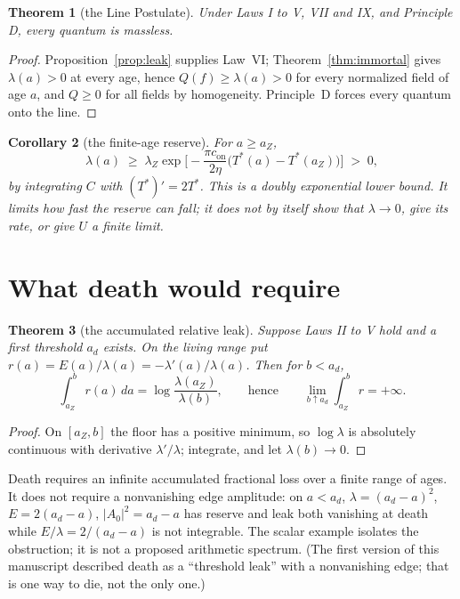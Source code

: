 \documentclass[11pt]{article}
\newtheorem{theorem}{Theorem}[section]
\newtheorem{corollary}[theorem]{Corollary}
\theoremstyle{definition}
\theoremstyle{remark}
\newcommand{\Tst}{T^{*}}
\newcommand{\lamZ}{\lambda_{Z}}
\newcommand{\con}{c_{\mathrm{on}}}
\begin{document}
\begin{theorem}[the Line Postulate]\label{thm:line}
Under Laws I to V, VII and IX, and Principle D, every quantum is massless.
\end{theorem}

\begin{proof}
Proposition~\ref{prop:leak} supplies Law~VI; Theorem~\ref{thm:immortal} gives $\lambda(a)>0$ at every age, hence $Q(f)\ge\lambda(a)>0$ for every normalized field of age $a$, and $Q\ge0$ for all fields by homogeneity. Principle~D forces every quantum onto the line.
\end{proof}

\begin{corollary}[the finite-age reserve]\label{cor:cooling}
For $a\ge a_Z$,
\[
\lambda(a)\;\ge\;\lamZ\exp\Big[-\frac{\pi\con}{2\eta}\big(\Tst(a)-\Tst(a_Z)\big)\Big]\;>\;0 ,
\]
by integrating $C$ with $(\Tst)'=2\Tst$. This is a doubly exponential lower bound. It limits how fast the reserve can fall; it does not by itself show that $\lambda\to0$, give its rate, or give $U$ a finite limit.
\end{corollary}

\section{What death would require}

\begin{theorem}[the accumulated relative leak]\label{thm:accum}
Suppose Laws II to V hold and a first threshold $a_d$ exists. On the living range put $r(a)=E(a)/\lambda(a)=-\lambda'(a)/\lambda(a)$. Then for $b<a_d$,
\[
\int_{a_Z}^{b}r(a)\,da=\log\frac{\lambda(a_Z)}{\lambda(b)},\qquad\text{hence}\qquad \lim_{b\uparrow a_d}\int_{a_Z}^{b}r=+\infty .
\]
\end{theorem}

\begin{proof}
On $[a_Z,b]$ the floor has a positive minimum, so $\log\lambda$ is absolutely continuous with derivative $\lambda'/\lambda$; integrate, and let $\lambda(b)\to0$.
\end{proof}

Death requires an infinite accumulated fractional loss over a finite range of ages. It does not require a nonvanishing edge amplitude: on $a<a_d$, $\lambda=(a_d-a)^2$, $E=2(a_d-a)$, $|A_0|^2=a_d-a$ has reserve and leak both vanishing at death while $E/\lambda=2/(a_d-a)$ is not integrable. The scalar example isolates the obstruction; it is not a proposed arithmetic spectrum. (The first version of this manuscript described death as a ``threshold leak'' with a nonvanishing edge; that is one way to die, not the only one.)
\end{document}
